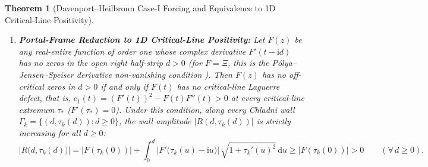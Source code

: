 \documentclass[11pt,reqno]{amsart}
\newtheorem{theorem}{Theorem}[section]
\theoremstyle{definition}
\theoremstyle{remark}
\numberwithin{equation}{section}
\newcommand{\dd}{\mathrm{d}}
\newcommand{\ii}{\mathrm{i}}
\begin{document}
\begin{theorem}[Davenport--Heilbronn Case-I Forcing and Equivalence to 1D Critical-Line Positivity]
\begin{enumerate}[label=\upshape(\alph*),leftmargin=2.2em]
\item \textbf{Portal-Frame Reduction to 1D Critical-Line Positivity:} Let $F(z)$ be any real-entire function of order one whose complex derivative $F'(t-\ii d)$ has no zeros in the open right half-strip $d > 0$ (for $F=\Xi$, this is the P\'{o}lya--Jensen--Speiser derivative non-vanishing condition \cite{Jensen1913,Polya1926,Speiser1934}). Then $F(z)$ has no off-critical zeros in $d>0$ if and only if $F(t)$ has no critical-line Laguerre defect, that is, $c_1(t) = (F'(t))^2 - F(t)F''(t) > 0$ at every critical-line extremum $\tau_*$ ($F'(\tau_*)=0$). Under this condition, along every Chladni wall $\Gamma_k = \{(d,\tau_k(d)) : d \ge 0\}$, the wall amplitude $|R(d,\tau_k(d))|$ is strictly increasing for all $d \ge 0$:
\begin{equation}\label{eq:wall-global-floor}
\bigl|R\bigl(d,\tau_k(d)\bigr)\bigr| = \bigl|F(\tau_k(0))\bigr| + \int_0^d \bigl|F'\bigl(\tau_k(u)-\ii u\bigr)\bigr|\,\sqrt{1 + \tau_k'(u)^2}\,\dd u \ge \bigl|F(\tau_k(0))\bigr| > 0 \qquad (\forall\,d \ge 0).
\end{equation}
\end{enumerate}
\end{theorem}
\end{document}

